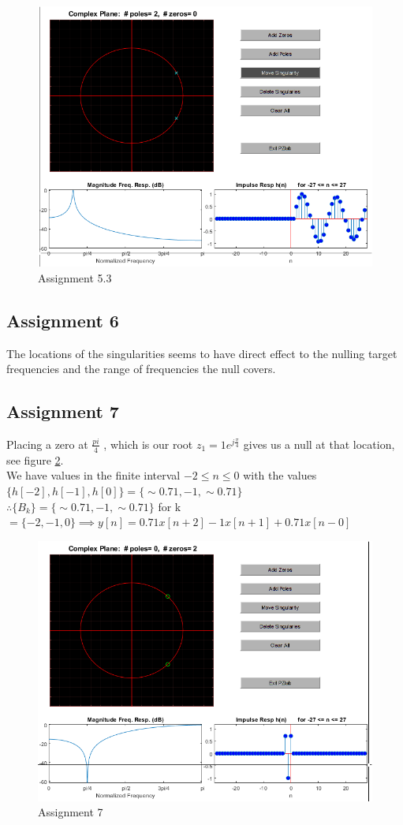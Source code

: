 \documentclass[a4paper]{article}
\begin{document}
\begin{figure}
    \centering
    \includegraphics{6.png}
    \caption{Assignment 5.3}
    \label{fig:6}
\end{figure}
\subsection{Assignment 6}
The locations of the singularities seems to have direct effect to the nulling target frequencies and the range of frequencies the null covers.
\subsection{Assignment 7}
Placing a zero at $\frac{pi}{4}$ , which is our root $z_1 = 1e^{j\frac{\pi}{4}}$ gives us a null at that location, see figure \ref{fig:7}.  \\
We have values in the finite interval $-2 \leq n \leq 0$ with the values $\{h[-2],h[-1],h[0]\} = \{\sim0.71,-1,\sim0.71\}$ \\ $\therefore \{B_k\} = \{\sim0.71,-1,\sim0.71\}$ for k $= \{-2,-1,0\} \implies y[n] = 0.71x[n+2]-1x[n+1]+ 0.71x[n-0]$ 
\begin{figure}
    \centering
    \includegraphics{7.png}
    \caption{Assignment 7}
    \label{fig:7}
\end{figure}
\end{document}
